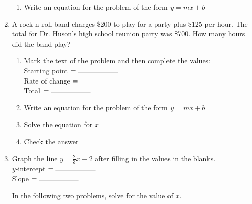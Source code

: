 \documentclass[12pt, oneside]{article}
\begin{document}
\begin{enumerate}
\begin{enumerate}
    \item Write an equation for the problem of the form $y=mx+b$\\[1.5cm]

  \end{enumerate}

  \item A rock-n-roll band charges \$200 to play for a party plus \$125 per hour. The total for Dr. Huson's high school reunion party was \$700. How many hours did the band play?
  \begin{enumerate}
    \item Mark the text of the problem and then complete the values:\\[0.5cm]
    Starting point $= \rule{2cm}{0.15mm}$ \\[0.5cm]
    Rate of change $= \rule{2cm}{0.15mm}$ \\[0.5cm]
    Total $= \rule{2cm}{0.15mm}$ \\

    \item Write an equation for the problem of the form $y=mx+b$\\[1.5cm]
    \item Solve the equation for $x$ \vspace{3.5cm}
    \item Check the answer \vspace{2.5cm}
  \end{enumerate}

\newpage
\item Graph the line $y=\frac{2}{3} x -2$ after filling in the values in the blanks.\\[0.85cm]
      $y$-intercept $= \rule{2cm}{0.15mm}$ \\[0.5cm]
      Slope $= \rule{2cm}{0.15mm}$\\

\begin{center} %
\end{center}

In the following two problems, solve for the value of $x$.


\end{enumerate}
\end{document}
